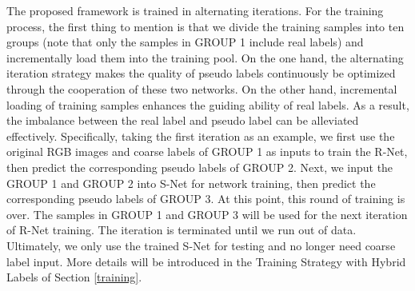 \documentclass[journal]{IEEEtran}
\begin{document}
The proposed framework is trained in alternating iterations. For the training process, the first thing to mention is that we divide the training samples into ten groups (note that only the samples in GROUP 1 include real labels) and incrementally load them into the training pool.
On the one hand, the alternating iteration strategy makes the quality of pseudo labels continuously be optimized through the cooperation of these two networks.
On the other hand, incremental loading of training samples enhances the guiding ability of real labels. As a result, the imbalance between the real label and pseudo label can be alleviated effectively.
Specifically, taking the first iteration as an example, we first use the original RGB images and coarse labels of GROUP 1 as inputs to train the R-Net, then predict the corresponding pseudo labels of GROUP 2. Next, we input the GROUP 1 and GROUP 2 into S-Net for network training, then predict the corresponding pseudo labels of GROUP 3.
At this point, this round of training is over.
The samples in GROUP 1 and GROUP 3 will be used for the next iteration of R-Net training.
The iteration is terminated until we run out of data.
Ultimately, we only use the trained S-Net for testing and no longer need coarse label input.
More details will be introduced in the Training Strategy with Hybrid Labels of Section \ref{training}.
\end{document}
